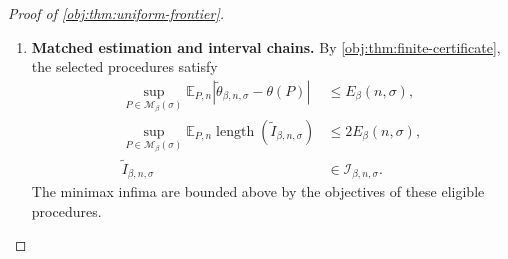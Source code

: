 \documentclass[11pt]{article}
\begin{document}
\begin{proof}[Proof of \cref{obj:thm:uniform-frontier}]
\begin{enumerate}
Define the dilation multiplier by
\[
\alpha_{\mathrm{dil}}=\frac{h_{\mathrm{up}}}{h_\star(n,\sigma)}.
\]
The width bounds imply
\[
(D_{\mathrm{env}}+1)^2\le\alpha_{\mathrm{dil}}\le A_{\mathrm{dil}},
\qquad
\alpha_{\mathrm{dil}}\ge1,
\qquad
\alpha_{\mathrm{dil}}h_\star(n,\sigma)=h_{\mathrm{up}}\le1.
\]
Thus \cref{obj:lem:noise-cost-scaling} applies and gives
\[
1+\Psi(h_{\mathrm{up}},\sigma)
\le\max\left\{
1,\,
\alpha_{\mathrm{dil}}^{-1/2}
[1+\Psi(h_\star(n,\sigma),\sigma)]
\right\}.
\]
Because \(D_{\mathrm{env}}/\sqrt{\alpha_{\mathrm{dil}}}\le1\), multiplication by
\(D_{\mathrm{env}}\) gives
\[
\begin{aligned}
D_{\mathrm{env}}[1+\Psi(h_{\mathrm{up}},\sigma)]
&\le
\max\left\{
D_{\mathrm{env}},\,
1+\Psi(h_\star(n,\sigma),\sigma)
\right\}\\
&\le D_{\mathrm{env}}+1+\Psi(h_\star(n,\sigma),\sigma).
\end{aligned}
\]
Hence
\[
V_{L_{\mathrm{up}}}(\sigma)
\le D_{\mathrm{env}}L_{\mathrm{up}}^2
 e^{D_{\mathrm{env}}+1}
 \exp\{\Psi(h_\star(n,\sigma),\sigma)\}.
\]
The rounding bound also gives
\[
L_{\mathrm{up}}^2
\le\frac4{A_{\mathrm{dil}}h_\star(n,\sigma)}
\le\frac4{h_\star(n,\sigma)}.
\]
Using the root balance and \(\nu=2\beta+1\), we obtain
\[
\frac{40V_{L_{\mathrm{up}}}(\sigma)}n
\le160D_{\mathrm{env}}e^{D_{\mathrm{env}}+1}
 h_\star(n,\sigma)^{2\beta},
\]
and therefore
\[
\sqrt{\frac{40V_{L_{\mathrm{up}}}(\sigma)}n}
\le Q_{\mathrm{var}}h_\star(n,\sigma)^\beta.
\]
The bias bound gives
\[
M_{L_{\mathrm{up}},\beta}
\le K_{\mathrm{bias}}h_{\mathrm{up}}^\beta
\le K_{\mathrm{bias}}A_{\mathrm{dil}}^\beta
 h_\star(n,\sigma)^\beta.
\]
Since \(L_{\mathrm{up}}\) is an eligible candidate,
\[
\begin{aligned}
E_\beta(n,\sigma)
&\le\rho_{L_{\mathrm{up}}}\\
&\le
(12K_{\mathrm{bias}}A_{\mathrm{dil}}^\beta+28Q_{\mathrm{var}})
 h_\star(n,\sigma)^\beta\\
&\le C_{\mathrm{up}}r_\beta(n,\sigma).
\end{aligned}
\]
Both cases establish this comparison over the full parameter range.

\item \textbf{Matched estimation and interval chains.}
By \cref{obj:thm:finite-certificate}, the selected procedures satisfy
\[
\begin{aligned}
\sup_{P\in\mathcal M_\beta(\sigma)}
\mathbb E_{P,n}
|\widetilde\theta_{\beta,n,\sigma}-\theta(P)|
&\le E_\beta(n,\sigma),\\
\sup_{P\in\mathcal M_\beta(\sigma)}
\mathbb E_{P,n}\operatorname{length}(\widetilde I_{\beta,n,\sigma})
&\le2E_\beta(n,\sigma),\\
\widetilde I_{\beta,n,\sigma}&\in\mathcal I_{\beta,n,\sigma}.
\end{aligned}
\]
The minimax infima are bounded above by the objectives of these eligible procedures.


\end{enumerate}
\end{proof}
\end{document}
